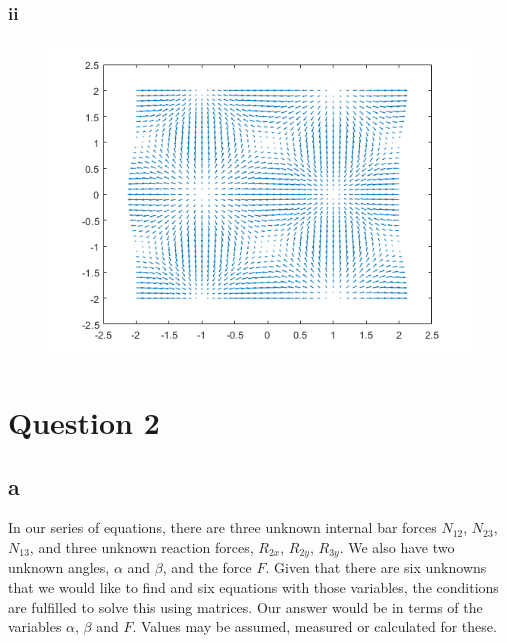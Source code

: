 \documentclass[11pt]{article}
\numberwithin{equation}{section}
\begin{document}
\subsubsection{ii}
\begin{figure}[H]
    \centering
    \includegraphics[width = 0.75 \textwidth]{./img/q1fii.png}
    \caption{}
\end{figure}

\section{Question 2}
\subsection{a}
In our series of equations, there are three unknown internal bar forces $N_{12}$, $N_{23}$, $N_{13}$, and three unknown reaction forces, $R_{2x}$, $R_{2y}$, $R_{3y}$. We also have two unknown angles, $\alpha$ and $\beta$, and the force $F$. Given that there are six unknowns that we would like to find and six equations with those variables, the conditions are fulfilled to solve this using matrices. Our answer would be in terms of the variables $\alpha$, $\beta$ and $F$. Values may be assumed, measured or calculated for these.
\end{document}
